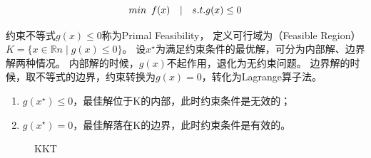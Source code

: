 \[
	min \enskip f(x) \quad \vert \quad s.t. g(x) \le 0
\]

约束不等式$g(x) \le 0$称为Primal Feasibility，
定义可行域为（Feasible Region）$K=\{x\in\mathbb{R}n∣g(x) \le 0\}$。
设$x^\star$为满足约束条件的最优解，可分为内部解、边界解两种情况。
内部解的时候，$g(x)$不起作用，退化为无约束问题。
边界解的时候，取不等式的边界，约束转换为$g(x)=0$，转化为Lagrange算子法。

\begin{enumerate}
	\item $g(x^\star) \le 0$，最佳解位于K的内部，此时约束条件是无效的；
	\item $g(x^\star)=0$，最佳解落在K的边界，此时约束条件是有效的。
\end{enumerate}

\begin{figure}[!htb] \centering 
	\caption{KKT}
\end{figure}

